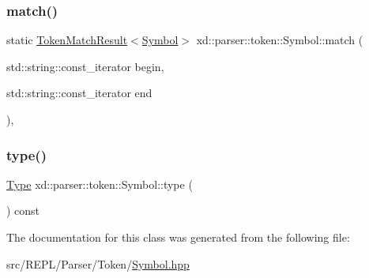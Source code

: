 \subsubsection{\texorpdfstring{match()}{match()}}
{\footnotesize\ttfamily static \mbox{\hyperlink{namespacexd_1_1parser_1_1token_a766c52bbfb7cb1f08498ef0bb9ec756e}{Token\+Match\+Result}}$<$\mbox{\hyperlink{classxd_1_1parser_1_1token_1_1_symbol}{Symbol}}$>$ xd\+::parser\+::token\+::\+Symbol\+::match (\begin{DoxyParamCaption}\item[{std\+::string\+::const\+\_\+iterator}]{begin,  }\item[{std\+::string\+::const\+\_\+iterator}]{end }\end{DoxyParamCaption})\hspace{0.3cm}{\ttfamily [inline]}, {\ttfamily [static]}}

\mbox{\label{classxd_1_1parser_1_1token_1_1_symbol_a8d390534fa6381eeb93da0305b06ac76}} 
\subsubsection{\texorpdfstring{type()}{type()}}
{\footnotesize\ttfamily \mbox{\hyperlink{classxd_1_1parser_1_1token_1_1_symbol_a1ccd1a684e22809f543b496a29564483}{Type}} xd\+::parser\+::token\+::\+Symbol\+::type (\begin{DoxyParamCaption}{ }\end{DoxyParamCaption}) const\hspace{0.3cm}{\ttfamily [inline]}}



The documentation for this class was generated from the following file\+:\begin{DoxyCompactItemize}
\item 
src/\+R\+E\+P\+L/\+Parser/\+Token/\mbox{\hyperlink{_symbol_8hpp}{Symbol.\+hpp}}\end{DoxyCompactItemize}
